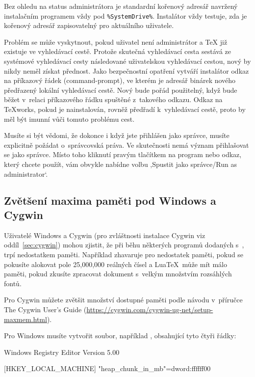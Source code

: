 \documentclass[\classoptions,slovak,english,czech]{\classname}
\newcommand{\singleuv}[1]{,#1`}
\begin{document}
Bez ohledu na status administrátora je standardní kořenový adresář \TL{}
navržený instalačním programem vždy pod \verb|%SystemDrive%|.
Instalátor vždy testuje, zda je kořenový adresář
zapisovatelný pro aktuálního uživatele.

Problém se může vyskytnout, pokud uživatel není administrátor a \TeX{} již
existuje ve vyhledávací cestě. Protože skutečná vyhledávací cesta sestává ze
systémové vyhledávací cesty následované uživatelskou vyhledávací cestou, 
nový \TL{} by nikdy neměl získat přednost.  
Jako bezpečnostní opatření vytváří instalátor odkaz na příkazový řádek
(command-prompt), ve kterém je adresář binárek nového \TL{} 
předřazený lokální vyhledávací cestě.  Nový \TL{} bude pořád použitelný, když
bude běžet v~relaci příkazového řádku spuštěné z~takového odkazu. Odkaz na 
\TeX{}works, pokud je nainstalován, rovněž předřadí \TL{} 
k~vyhledávací cestě, proto by měl být imunní vůči tomuto problému cest.

Musíte si být vědomi, že dokonce i když jste 
přihlášen jako správce,
musíte explicitně požádat o~správcovská práva. Ve skutečnosti nemá význam
přihlašovat se jako správce. Místo toho kliknutí pravým 
tlačítkem na program nebo odkaz,
který chcete použít, vám obvykle nabídne volbu
\singleuv{Spustit jako správce/Run as administrator}.


\subsection{Zvětšení maxima paměti pod Windows a Cygwin}
\label{sec:cygwin-maxmem}

Uživatelé Windows a Cygwin (pro zvláštnosti
instalace Cygwin viz oddíl~\ref{sec:cygwin}) 
mohou zjistit, že při běhu některých programů dodaných s~\TL, 
trpí nedostatkem paměti.  Například  zhavaruje pro 
nedostatek paměti,
pokud se pokusíte alokovat pole 25,000,000 reálných čísel a
Lua\TeX\ může mít málo paměti, pokud zkusíte zpracovat dokument
s~velkým množstvím rozsáhlých fontů.

Pro Cygwin můžete zvětšit množství dostupné paměti podle
návodu v~příručce The Cygwin User's Guide
(\url{https://cygwin.com/cygwin-ug-net/setup-maxmem.html}).

Pro Windows musíte vytvořit soubor, například , obsahující
tyto čtyři řádky:

\begin{sverbatim}
Windows Registry Editor Version 5.00

[HKEY_LOCAL_MACHINE\Software\Cygwin]
"heap_chunk_in_mb"=dword:ffffff00
\end{sverbatim}
\end{document}
